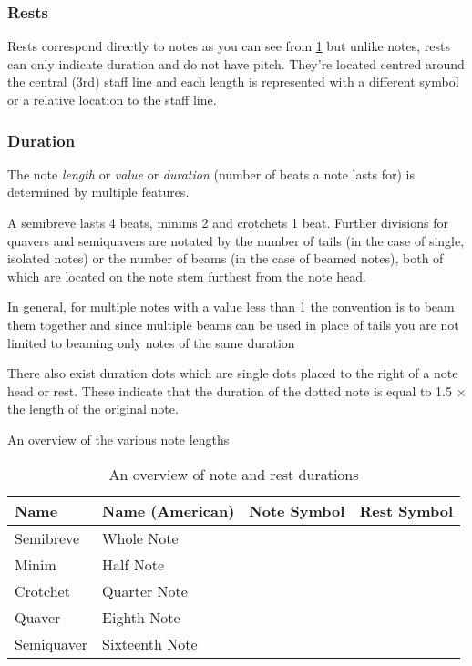 \subsubsection{Rests}
\label{sec:music-theory-rests}

Rests correspond directly to notes as you can see from \cref{table:note-lengths} but unlike notes, rests can only indicate duration and do not have pitch. They're located centred around the central (3rd) staff line and each length is represented with a different symbol or a relative location to the staff line.

\subsubsection{Duration}
\label{sec:music-theory-duration}

The note \emph{length} or \emph{value} or \emph{duration} (number of beats a note lasts for) is determined by multiple features.

A semibreve lasts 4 beats, minims 2 and crotchets 1 beat. Further divisions for quavers and semiquavers are notated by the number of tails (in the case of single, isolated notes) or the number of beams (in the case of beamed notes), both of which are located on the note stem furthest from the note head.

In general, for multiple notes with a value less than 1 the convention is to beam them together and since multiple beams can be used in place of tails you are not limited to beaming only notes of the same duration

There also exist duration dots which are single dots placed to the right of a note head or rest. These indicate that the duration of the dotted note is equal to 1.5 $\times$ the length of the original note.

An overview of the various note lengths

\begin{table}[H]
    \renewcommand{\arraystretch}{1.8}
    \centering
    \begin{tabularx}{\textwidth}{ llll }
        \toprule

        Name & Name (American) & Note Symbol & Rest Symbol \\
        \midrule
        Semibreve & Whole Note & & \\
        Minim & Half Note & & \\
        Crotchet & Quarter Note & & \\
        Quaver & Eighth Note & & \\
        Semiquaver & Sixteenth Note & & \\

        \bottomrule
    \end{tabularx}
    \caption{An overview of note and rest durations}
    \label{table:note-lengths}
\end{table}

